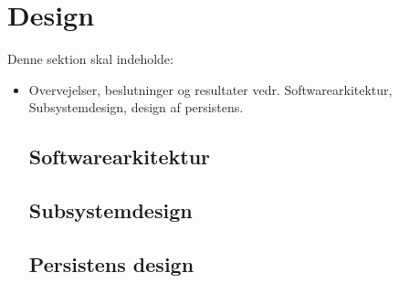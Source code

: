 \section{Design}
Denne sektion skal indeholde:

\begin{itemize}
    \item Overvejelser, beslutninger og resultater vedr. Softwarearkitektur, Subsystemdesign, design af persistens. 
    
    \subsection{Softwarearkitektur}
    \subsection{Subsystemdesign}
    \subsection{Persistens design}
\end{itemize}{}